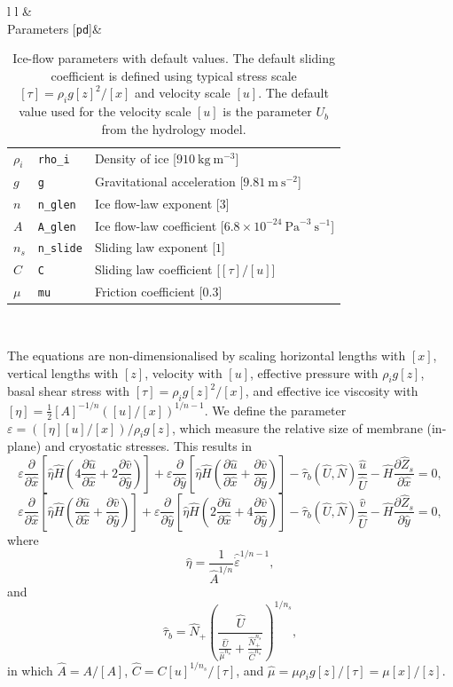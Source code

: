 \documentclass[a4paper,11pt,fleqn]{article}
\newcommand{\un}[1]{\ \textrm{#1}}
\newcommand{\be}{\begin{equation} }
\newcommand{\ee}{\end{equation}}
\newcommand{\eps}{\varepsilon}
\newcommand{\pd}[2]{\frac{\partial #1}{\partial #2}}
\newcommand{\half}{\mbox{$\frac{1}{2}$}}
\begin{document}
{\begin{table}[!h]
\centering
{\small 
\begin{tabular}{l l}
\hline
& \\[-10pt]
\hline
Parameters [\verb|pd|]&
\begin{tabular}[t]{l l l}
$\rho_i$ 		&\verb|rho_i| &  Density of ice [$910\un{kg}\un{m}^{-3}$]\\ 
$g$			&\verb|g| &  Gravitational acceleration [$9.81\un{m}\un{s}^{-2}$]\\
$n$			&\verb|n_glen| &  Ice flow-law exponent [$3$]\\
$A$         		&\verb|A_glen| &  Ice flow-law coefficient [$6.8 \times 10^{-24} \un{Pa}^{-3} \un{s}^{-1}$]\\
$n_s$		&\verb|n_slide| &  Sliding law exponent [$1$]\\
$C$         		&\verb|C| &  Sliding law coefficient [$[\tau]/[u]$]\\
$\mu$         	&\verb|mu| &  Friction coefficient [$0.3$]\\
\end{tabular}  \\
\hline
\end{tabular}
}
\caption{\label{tab1}{\small Ice-flow parameters with default values. The default sliding coefficient is defined using typical stress scale $[\tau] = \rho_i g [z]^2/[x]$ and velocity scale $[u]$. The default value used for the velocity scale $[u]$ is the parameter $U_b$ from the hydrology model.}  }
\end{table}


The equations are non-dimensionalised by scaling horizontal lengths with $[x]$, vertical lengths with $[z]$, velocity with $[u]$, effective pressure with $\rho_i g [z]$, basal shear stress with $[\tau] = \rho_i g [z]^2 /[x]$, and effective ice viscosity with $[\eta] = \half [A]^{-1/n} ([u]/[x])^{1/n-1}$.   We define the parameter $\eps = ([\eta][u]/[x])/\rho_i g [z]$, which measure the relative size of membrane (in-plane) and cryostatic stresses.  This results in 
\be
\eps \pd{}{\hat{x}} \left[ \hat{\eta} \hat{H} \left( 4 \pd{\hat{u}}{\hat{x}} + 2 \pd{\hat{v}}{\hat{y}} \right)  \right]+ \eps \pd{}{\hat{y}} \left[ \hat{\eta} \hat{H} \left( \pd{\hat{u}}{\hat{x}} + \pd{\hat{v}}{\hat{y}} \right)\right] - \hat{\tau}_b(\hat{U},\hat{N}) \frac{\hat{u}}{\hat{U}} - \hat{H} \pd{\hat{Z}_s}{\hat{x}} = 0,
\ee
\be
\eps \pd{}{\hat{x}} \left[ \hat{\eta} \hat{H} \left( \pd{\hat{u}}{\hat{x}} + \pd{\hat{v}}{\hat{y}} \right)  \right]+ \eps \pd{}{\hat{y}} \left[ \hat{\eta} \hat{H} \left( 2 \pd{\hat{u}}{\hat{x}} + 4 \pd{\hat{v}}{\hat{y}} \right) \right] - \hat{\tau}_b(\hat{U},\hat{N}) \frac{\hat{v}}{\hat{U}} - \hat{H} \pd{\hat{Z}_s}{\hat{y}} = 0,
\ee
where 
\be
\hat{\eta} = \frac{1}{\hat{A}^{1/n}} \hat{\dot{\eps}}^{1/n-1},
\ee
and
\be
\hat{\tau}_b = \hat{N}_+\left( \frac{\hat{U}}{\frac{\hat{U}}{\hat{\mu}^{n_s}} + \frac{ \hat{N}_+^{n_s}}{\hat{C}^{n_s}}}\right)^{1/n_s},
\ee
in which $\hat{A} = A/[A]$, $\hat{C} = C [u]^{1/n_s} /[\tau]$, and $\hat{\mu} = \mu \rho_i g [z]/[\tau] = \mu [x]/[z]$.

}
\end{document}
